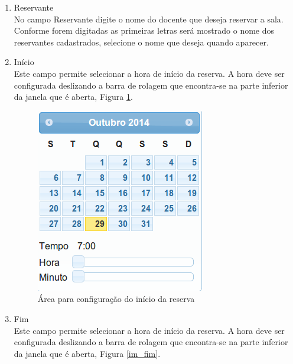 \documentclass[openany,10pt,a4paper]{book}
\begin{document}
\begin{enumerate}
\item{Reservante}\\
No campo Reservante digite o nome do docente que deseja reservar a sala. Conforme forem digitadas as primeiras letras será mostrado o nome dos reservantes cadastrados, selecione o nome que deseja quando aparecer.
\item{Início}\\
Este campo permite selecionar a hora de início da reserva. A hora deve ser configurada deslizando a barra de rolagem que encontra-se na parte inferior da janela que é aberta, Figura \ref{im_inicio}.

\begin{figure}[!htb]
    \centering
    \includegraphics[scale=0.5]{inicio.png}
    \caption{Área para configuração do início da reserva}
    \label{im_inicio}
\end{figure}
\item{Fim}\\
Este campo permite selecionar a hora de início da reserva. A hora deve ser configurada deslizando a barra de rolagem que encontra-se na parte inferior da janela que é aberta, Figura \ref{im_fim}.


\end{enumerate}
\end{document}
